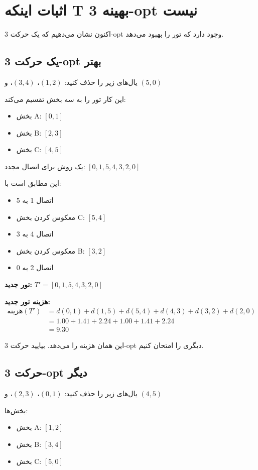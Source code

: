 \documentclass[12pt,a4paper]{article}
\begin{document}
\section{اثبات اینکه T بهینه 3-opt نیست}

اکنون نشان می‌دهیم که یک حرکت 3-opt وجود دارد که تور را بهبود می‌دهد.

\subsection{یک حرکت 3-opt بهتر}

یال‌های زیر را حذف کنید: $(1,2)$، $(3,4)$، و $(5,0)$

این کار تور را به سه بخش تقسیم می‌کند:
\begin{itemize}
    \item بخش A: $[0, 1]$
    \item بخش B: $[2, 3]$
    \item بخش C: $[4, 5]$
\end{itemize}

یک روش برای اتصال مجدد: $[0, 1, 5, 4, 3, 2, 0]$

این مطابق است با:
\begin{itemize}
    \item اتصال 1 به 5
    \item معکوس کردن بخش C: $[5, 4]$
    \item اتصال 4 به 3
    \item معکوس کردن بخش B: $[3, 2]$
    \item اتصال 2 به 0
\end{itemize}

\textbf{تور جدید:} $T' = [0, 1, 5, 4, 3, 2, 0]$

\textbf{هزینه تور جدید:}
\begin{align*}
\text{هزینه}(T') &= d(0,1) + d(1,5) + d(5,4) + d(4,3) + d(3,2) + d(2,0) \\
&= 1.00 + 1.41 + 2.24 + 1.00 + 1.41 + 2.24 \\
&= 9.30
\end{align*}

این همان هزینه را می‌دهد. بیایید حرکت 3-opt دیگری را امتحان کنیم.

\subsection{حرکت 3-opt دیگر}

یال‌های زیر را حذف کنید: $(0,1)$، $(2,3)$، و $(4,5)$

بخش‌ها:
\begin{itemize}
    \item بخش A: $[1, 2]$
    \item بخش B: $[3, 4]$
    \item بخش C: $[5, 0]$
\end{itemize}
\end{document}
